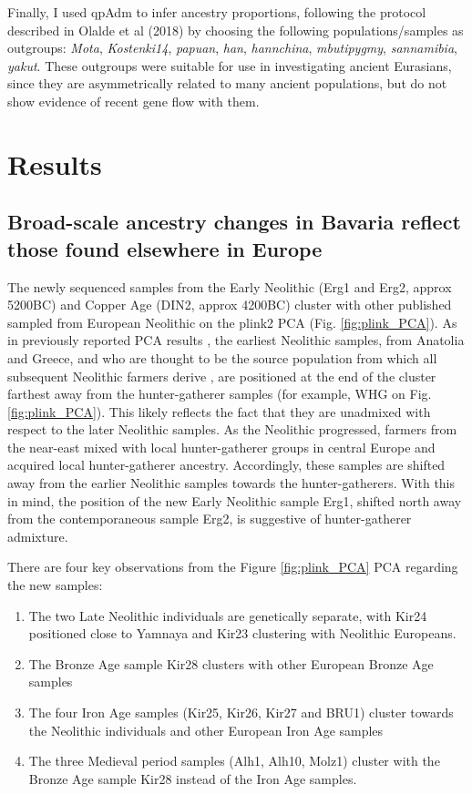Finally, I used qpAdm to infer ancestry proportions, following the protocol described in Olalde et al (2018) by choosing the following populations/samples as outgroups: \textit{Mota}, \textit{Kostenki14}, \textit{papuan}, \textit{han}, \textit{hannchina}, \textit{mbutipygmy}, \textit{sannamibia}, \textit{yakut}. These outgroups were suitable for use in investigating ancient Eurasians, since they are asymmetrically related to many ancient populations, but do not show evidence of recent gene flow with them. 

\section{Results}

\subsection{Broad-scale ancestry changes in Bavaria reflect those found elsewhere in Europe}

The newly sequenced samples from the Early Neolithic (Erg1 and Erg2, approx 5200BC) and Copper Age (DIN2, approx 4200BC) cluster with other published sampled from European Neolithic on the plink2 PCA (Fig. \ref{fig:plink_PCA}). As in previously reported PCA results \cite{Lipson2017b}, the earliest Neolithic samples, from Anatolia and Greece, and who are thought to be the source population from which all subsequent Neolithic farmers derive \cite{Hofmanova2016, Haak2010, haak2005ancient, bramanti2009genetic, Lazaridis2014}, are  positioned at the end of the cluster farthest away from the hunter-gatherer samples (for example, WHG on Fig. \ref{fig:plink_PCA}). This likely reflects the fact that they are unadmixed with respect to the later Neolithic samples. As the Neolithic progressed, farmers from the near-east mixed with local hunter-gatherer groups in central Europe \cite{Lipson2017b} and acquired local hunter-gatherer ancestry. Accordingly, these samples are shifted away from the earlier Neolithic samples towards the hunter-gatherers. With this in mind, the position of the new Early Neolithic sample Erg1, shifted north away from the contemporaneous sample Erg2, is suggestive of hunter-gatherer admixture. 

There are four key observations from the Figure \ref{fig:plink_PCA} PCA regarding the new samples:

\begin{enumerate}
\item The two Late Neolithic individuals are genetically separate, with Kir24 positioned close to Yamnaya and Kir23 clustering with Neolithic Europeans.
\item The Bronze Age sample Kir28 clusters with other European Bronze Age samples
\item The four Iron Age samples (Kir25, Kir26, Kir27 and BRU1) cluster towards the Neolithic individuals and other European Iron Age samples
\item The three Medieval period samples (Alh1, Alh10, Molz1) cluster with the Bronze Age sample Kir28 instead of the Iron Age samples.
\end{enumerate}

